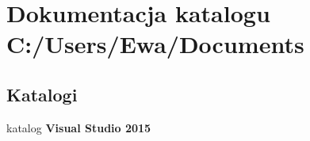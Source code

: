 \section{Dokumentacja katalogu C\+:/\+Users/\+Ewa/\+Documents}
\label{dir_bff69e5e6595124054177f436e9474e9}
\subsection*{Katalogi}
\begin{DoxyCompactItemize}
\item 
katalog \textbf{ Visual Studio 2015}
\end{DoxyCompactItemize}
